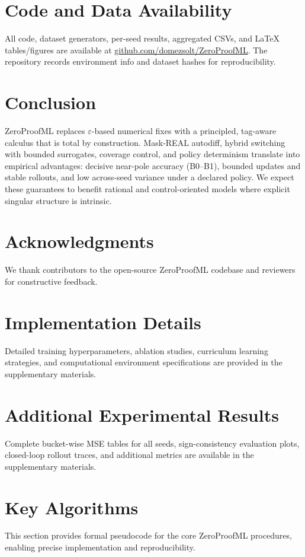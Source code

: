 \documentclass[twoside,11pt]{article}
\begin{document}
\section*{Code and Data Availability}
All code, dataset generators, per-seed results, aggregated CSVs, and LaTeX tables/figures are available at \href{https://github.com/domezsolt/ZeroProofML}{github.com/domezsolt/ZeroProofML}. The repository records environment info and dataset hashes for reproducibility.

\section*{Conclusion}
ZeroProofML replaces $\varepsilon$-based numerical fixes with a principled, tag-aware calculus that is total by construction. Mask-REAL autodiff, hybrid switching with bounded surrogates, coverage control, and policy determinism translate into empirical advantages: decisive near-pole accuracy (B0--B1), bounded updates and stable rollouts, and low across-seed variance under a declared policy. We expect these guarantees to benefit rational and control-oriented models where explicit singular structure is intrinsic.

\section*{Acknowledgments}
We thank contributors to the open-source ZeroProofML codebase and reviewers for constructive feedback.

\endgroup

\section{Implementation Details}
\label{app:implementation}
Detailed training hyperparameters, ablation studies, curriculum learning strategies, and computational environment specifications are provided in the supplementary materials.

\section{Additional Experimental Results}
\label{app:results}
Complete bucket-wise MSE tables for all seeds, sign-consistency evaluation plots, closed-loop rollout traces, and additional metrics are available in the supplementary materials.

\section{Key Algorithms}
\label{app:algorithms}
This section provides formal pseudocode for the core ZeroProofML procedures, enabling precise implementation and reproducibility.
\end{document}
